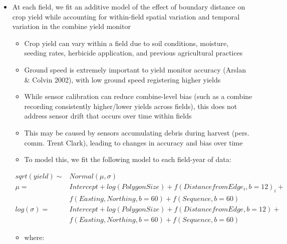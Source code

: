 \documentclass[]{elsarticle} %
\providecommand{\tightlist}{%
  \setlength{\itemsep}{0pt}\setlength{\parskip}{0pt}}
\begin{document}
\begin{itemize}
\item
  At each field, we fit an additive model of the effect of boundary distance on crop yield while accounting for within-field spatial variation and temporal variation in the combine yield monitor

  \begin{itemize}
  \item
    Crop yield can vary within a field due to soil conditions, moisture, seeding rates, herbicide application, and previous agricultural practices
  \item
    Ground speed is extremely important to yield monitor accuracy (Arslan \& Colvin 2002), with low ground speed registering higher yields
  \item
    While sensor calibration can reduce combine-level bias (such as a combine recording consistently higher/lower yields across fields), this does not address sensor drift that occurs over time within fields
  \item
    This may be caused by sensors accumulating debris during harvest (pers. comm. Trent Clark), leading to changes in accuracy and bias over time
  \item
    To model this, we fit the following model to each field-year of data:
  \end{itemize}

  \begin{equation}
  \begin{split}
  sqrt(yield) \sim & Normal (\mu, \sigma)\\
  \mu = & Intercept + log(Polygon Size) + f(Distance from Edge_i, b=12)_i + \\
   & f(Easting, Northing, b=60) + f(Sequence, b=60) \\
  log(\sigma) = & Intercept + log(Polygon Size) + f(Distance from Edge, b=12) + \\
   & f(Easting, Northing, b=60) + f(Sequence, b=60)
  \end{split}
  \end{equation}

  \begin{itemize}
  \tightlist
  \item
    where:
  \end{itemize}


\end{itemize}
\end{document}
